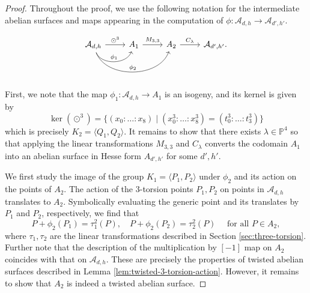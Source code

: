 \documentclass[11pt]{amsart}
\theoremstyle{definition}
\newcommand{\A}{\mathcal{A}}
\newcommand{\PP}{\mathbb{P}}
\newcommand{\cube}{\odot^3}
\begin{document}
\begin{proof} 	
	Throughout the proof, we use the following notation for the intermediate abelian surfaces and maps appearing in the computation of $\phi: \A_{d,h} \to \A_{d',h'}$.
	
	\[
	\begin{tikzcd}
		\A_{d,h} \rar{\cube} \arrow[bend right = 70, "\phi_1"]{r}  \arrow[bend right = 70, "\phi_2"]{rr}  & A_1 \rar{M_{3,3}} & A_2 \rar{C_\lambda} & \A_{d',h'}.
	\end{tikzcd}
	\]
	
	First, we note that the map $\phi_1: \A_{d,h} \to A_1$ is an isogeny, and its kernel is given by \[
	\ker(\cube) = \{(x_0:\dots:x_8) \mid (x_0^3 : \dots : x_8^3) = (t_0^3: \dots: t_3^3)\}
	\]  
	which is precisely $K_2=\langle Q_1,Q_2 \rangle$. It remains to show that there exists $\lambda \in \PP^4$ so that applying the linear transformations $M_{3,3}$ and $C_\lambda$ converts the codomain $A_1$ into an abelian surface in Hesse form $A_{d',h'}$ for some $d',h'$.
	
	
	We first study the image of the group $K_1 = \langle P_1, P_2 \rangle$ under  $\phi_2$ and its action on the points of ${A}_2$. 
%	
	The action of the $3$-torsion points $P_1,P_2$ on points in $\A_{d,h}$ translates to ${A}_2$. Symbolically evaluating the generic point and its translates by $P_1$ and $P_2$, respectively, we find that  
	\[
	P + \phi_2({P}_1) = \tau_1^2(P), \quad P + \phi_2({P}_2) = \tau_2^2(P) \quad \text{ for all } P \in {A_2},
	\]
	where $\tau_1,\tau_2$ are the linear transformations described in Section \ref{sec:three-torsion}.  Further note that the description of the multiplication by $[-1]$ map on $A_2$ coincides with that on $\A_{d,h}$.  These are precisely the properties of twisted abelian surfaces described in Lemma \ref{lem:twisted-3-torsion-action}. However, it remains to show that $A_2$ is indeed a twisted abelian surface.
	

\end{proof}
\end{document}
